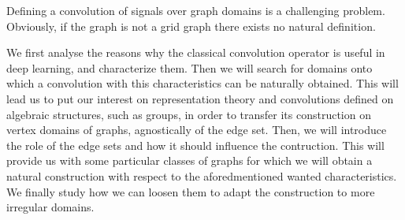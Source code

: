 Defining a convolution of signals over graph domains is a challenging problem. Obviously, if the graph is not a grid graph there exists no natural definition.

We first analyse the reasons why the classical convolution operator is useful in deep learning, and characterize them. Then we will search for domains onto which a convolution with this characteristics can be naturally obtained. This will lead us to put our interest on representation theory and convolutions defined on algebraic structures, such as groups, in order to transfer its construction on vertex domains of graphs, agnostically of the edge set. Then, we will introduce the role of the edge sets and how it should influence the contruction. This will provide us with some particular classes of graphs for which we will obtain a natural construction with respect to the aforedmentioned wanted characteristics. We finally study how we can loosen them to adapt the construction to more irregular domains.